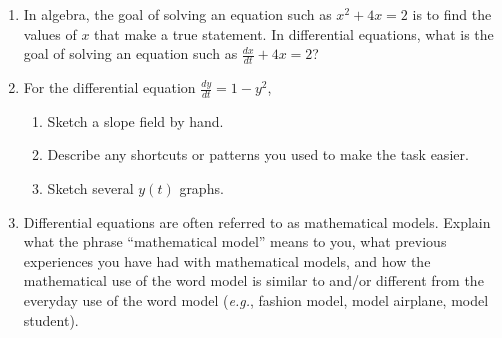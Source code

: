 \begin{enumerate}
\item In algebra, the goal of solving an equation such as $x^2 + 4x =2$ is to find the values of $x$ that make a true statement. In differential equations, what is the goal of solving an equation such as $\displaystyle\frac{dx}{dt}+4x=2$? 

\item  For the differential equation   $\displaystyle \frac{dy}{dt}=1-y^2$,
\begin{enumerate}
\item	Sketch a slope field by hand. 
\item	Describe any shortcuts or patterns you used to make the task easier.
\item	Sketch several $y(t)$ graphs.
\end{enumerate}

\item Differential equations are often referred to as mathematical models. Explain what the phrase ``mathematical model'' means to you, what previous experiences you have had with mathematical models, and how the mathematical use of the word model is similar to and/or different from the everyday use of the word model ({\em e.g.}, fashion model, model airplane, model student).



\end{enumerate}

